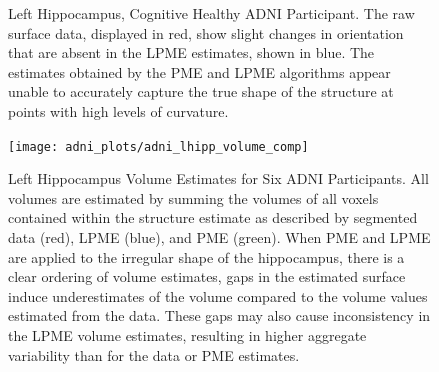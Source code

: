 \documentclass[11pt,reqno]{article}
\theoremstyle{definition}
\begin{document}
\begin{figure}%
  \centering
  \hfill
  \hfill

  \caption{Left Hippocampus, Cognitive Healthy ADNI Participant. The raw surface data, displayed in red, show slight changes in orientation that are absent in the LPME estimates, shown in blue. The estimates obtained by the PME and LPME algorithms appear unable to accurately capture the true shape of the structure at points with high levels of curvature.}
  \label{fig:adni_result}
\end{figure}

%
%
%


\begin{figure}[h]
  \centering
  \texttt{[image: adni\_plots/adni\_lhipp\_volume\_comp]}
  \caption{Left Hippocampus Volume Estimates for Six ADNI Participants. All volumes are estimated by summing the volumes of all voxels contained within the structure estimate as described by segmented data (red), LPME (blue), and PME (green). When PME and LPME are applied to the irregular shape of the hippocampus, there is a clear ordering of volume estimates, gaps in the estimated surface induce underestimates of the volume compared to the volume values estimated from the data. These gaps may also cause inconsistency in the LPME volume estimates, resulting in higher aggregate variability than for the data or PME estimates.}
  \label{fig:lhipp_volume_comparison}
\end{figure}
\end{document}
